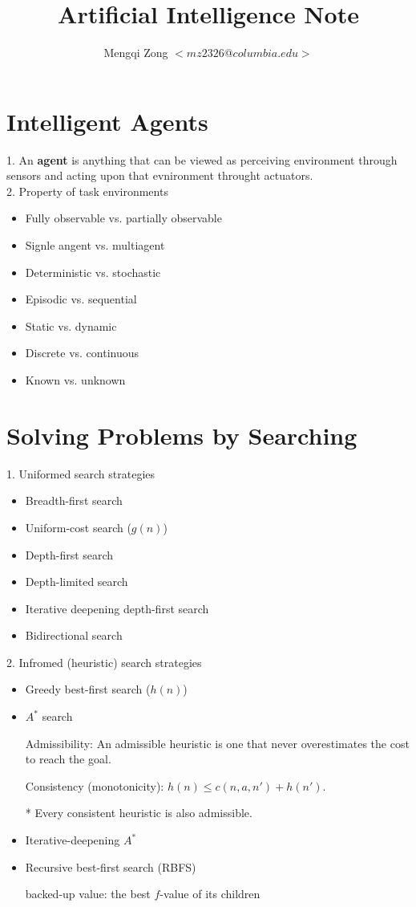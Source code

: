 \documentclass[12pt]{article}
\title{Artificial Intelligence Note}
\author{Mengqi Zong $<mz2326@columbia.edu>$}
\begin{document}
\maketitle

\setlength{\parindent}{0in}

\section*{Intelligent Agents}

1. An {\bf agent} is anything that can be viewed as perceiving environment through sensors and acting upon that evnironment throught actuators. \\

2. Property of task environments

\begin{itemize}
  \item Fully observable vs. partially observable
  \item Signle angent vs. multiagent
  \item Deterministic vs. stochastic
  \item Episodic vs. sequential
  \item Static vs. dynamic
  \item Discrete vs. continuous
  \item Known vs. unknown
\end{itemize}

\section*{Solving Problems by Searching}

1. Uniformed search strategies

\begin{itemize}
  \item Breadth-first search
  \item Uniform-cost search ($g(n)$)
  \item Depth-first search
  \item Depth-limited search
  \item Iterative deepening depth-first search
  \item Bidirectional search
\end{itemize}

2. Infromed (heuristic) search strategies

\begin{itemize}
  \item Greedy best-first search ($h(n)$)
  \item $A^*$ search

    Admissibility: An admissible heuristic is one that never overestimates the cost to reach the goal.

    Consistency (monotonicity): $h(n) \le c(n,a,n') + h(n')$.

    * Every consistent heuristic is also admissible.
  \item Iterative-deepening $A^*$
  \item Recursive best-first search (RBFS)

    backed-up value: the best $f$-value of its children
\end{itemize}
\end{document}
